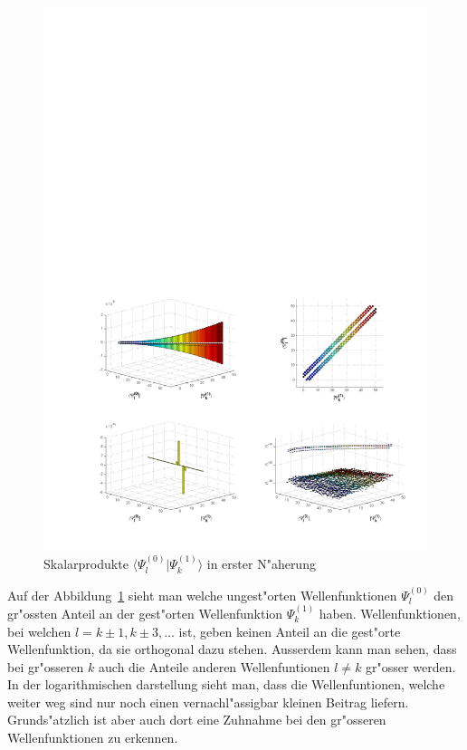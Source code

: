 \begin{refsection}
\begin{figure}	%
\centering
\includegraphics[width=1.0\textwidth]{anharmonisch/images/x4/Stoerung1Skalare.pdf}
\caption{Skalarprodukte $\langle\Psi_l^{(0)}|\Psi_k^{(1)}\rangle$ in erster N"aherung
\label{skript:x4_Stoerung1Skalare}}
\end{figure}

Auf der Abbildung~\ref{skript:x4_Stoerung1Skalare} sieht man welche ungest"orten Wellenfunktionen $\Psi_l^{(0)}$ den gr"ossten Anteil an der gest"orten Wellenfunktion $\Psi_k^{(1)}$ haben. Wellenfunktionen, bei welchen $l=k\pm 1,k\pm 3,\dots$ ist, geben keinen Anteil an die gest"orte Wellenfunktion, da sie orthogonal dazu stehen. Ausserdem kann man sehen, dass bei gr"osseren $k$ auch die Anteile anderen Wellenfuntionen $l\neq k$ gr"osser werden. In der logarithmischen darstellung sieht man, dass die Wellenfuntionen, welche weiter weg sind nur noch einen vernachl"assigbar kleinen Beitrag liefern. Grunds"atzlich ist aber auch dort eine Zuhnahme bei den gr"osseren Wellenfunktionen zu erkennen.



\end{refsection}

